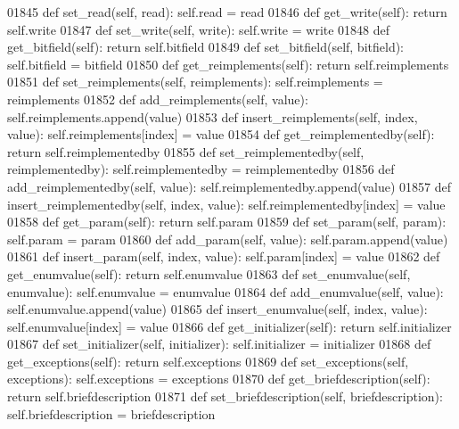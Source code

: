\begin{DoxyCode}
{{{{{{{{{{{{{{{{{{{{{{{{{{{{{{{{{{{{{{{{{{{{{{{{{{{{{{{{{{{{{{{{{{{{{{{{{{{{{{{{{{{{{{{{{{{{{{{{{{{{{{{{{{{{{{{{{{01845     \textcolor{keyword}{def }set_read(self, read): self.read = read
01846     \textcolor{keyword}{def }get_write(self): \textcolor{keywordflow}{return} self.write
01847     \textcolor{keyword}{def }set_write(self, write): self.write = write
01848     \textcolor{keyword}{def }get_bitfield(self): \textcolor{keywordflow}{return} self.bitfield
01849     \textcolor{keyword}{def }set_bitfield(self, bitfield): self.bitfield = bitfield
01850     \textcolor{keyword}{def }get_reimplements(self): \textcolor{keywordflow}{return} self.reimplements
01851     \textcolor{keyword}{def }set_reimplements(self, reimplements): self.reimplements = reimplements
01852     \textcolor{keyword}{def }add_reimplements(self, value): self.reimplements.append(value)
01853     \textcolor{keyword}{def }insert_reimplements(self, index, value): self.reimplements[index] = value
01854     \textcolor{keyword}{def }get_reimplementedby(self): \textcolor{keywordflow}{return} self.reimplementedby
01855     \textcolor{keyword}{def }set_reimplementedby(self, reimplementedby): self.reimplementedby = reimplementedby
01856     \textcolor{keyword}{def }add_reimplementedby(self, value): self.reimplementedby.append(value)
01857     \textcolor{keyword}{def }insert_reimplementedby(self, index, value): self.reimplementedby[index] = value
01858     \textcolor{keyword}{def }get_param(self): \textcolor{keywordflow}{return} self.param
01859     \textcolor{keyword}{def }set_param(self, param): self.param = param
01860     \textcolor{keyword}{def }add_param(self, value): self.param.append(value)
01861     \textcolor{keyword}{def }insert_param(self, index, value): self.param[index] = value
01862     \textcolor{keyword}{def }get_enumvalue(self): \textcolor{keywordflow}{return} self.enumvalue
01863     \textcolor{keyword}{def }set_enumvalue(self, enumvalue): self.enumvalue = enumvalue
01864     \textcolor{keyword}{def }add_enumvalue(self, value): self.enumvalue.append(value)
01865     \textcolor{keyword}{def }insert_enumvalue(self, index, value): self.enumvalue[index] = value
01866     \textcolor{keyword}{def }get_initializer(self): \textcolor{keywordflow}{return} self.initializer
01867     \textcolor{keyword}{def }set_initializer(self, initializer): self.initializer = initializer
01868     \textcolor{keyword}{def }get_exceptions(self): \textcolor{keywordflow}{return} self.exceptions
01869     \textcolor{keyword}{def }set_exceptions(self, exceptions): self.exceptions = exceptions
01870     \textcolor{keyword}{def }get_briefdescription(self): \textcolor{keywordflow}{return} self.briefdescription
01871     \textcolor{keyword}{def }set_briefdescription(self, briefdescription): self.briefdescription = briefdescription
}}}}}}}}}}}}}}}}}}}}}}}}}}}}}}}}}}}}}}}}}}}}}}}}}}}}}}}}}}}}}}}}}}}}}}}}}}}}}}}}}}}}}}}}}}}}}}}}}}}}}}}}}}}}}}}}}}
\end{DoxyCode}
